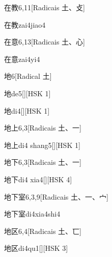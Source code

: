 \begin{entry}{在教}{6,11}[Radicais ⼟、⽁]
  \begin{phonetics}{在教}{zai4jiao4}
  \end{phonetics}
\end{entry}

\begin{entry}{在意}{6,13}[Radicais ⼟、⼼]
  \begin{phonetics}{在意}{zai4yi4}
  \end{phonetics}
\end{entry}

\begin{entry}{地}{6}[Radical ⼟]
  \begin{phonetics}{地}{de5}[][HSK 1]
  \end{phonetics}
  \begin{phonetics}{地}{di4}[][HSK 1]
  \end{phonetics}
\end{entry}

\begin{entry}{地上}{6,3}[Radicais ⼟、⼀]
  \begin{phonetics}{地上}{di4 shang5}[][HSK 1]
  \end{phonetics}
\end{entry}

\begin{entry}{地下}{6,3}[Radicais ⼟、⼀]
  \begin{phonetics}{地下}{di4 xia4}[][HSK 4]
  \end{phonetics}
\end{entry}

\begin{entry}{地下室}{6,3,9}[Radicais ⼟、⼀、⼧]
  \begin{phonetics}{地下室}{di4xia4shi4}
  \end{phonetics}
\end{entry}

\begin{entry}{地区}{6,4}[Radicais ⼟、⼖]
  \begin{phonetics}{地区}{di4qu1}[][HSK 3]
  \end{phonetics}
\end{entry}

